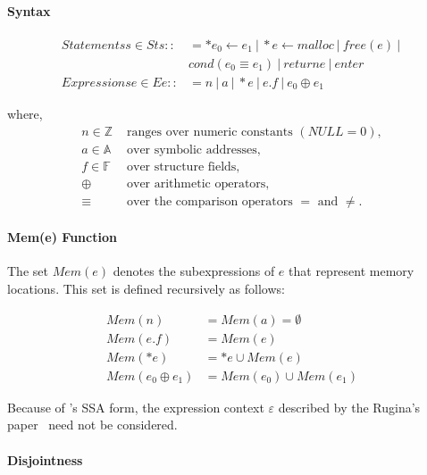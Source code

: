 \paragraph{Syntax} 
\begin{align*}
  Statements s\in St s:: &= *e_0\gets e_1\ |\ *e\gets malloc\ |\ free(e)\ |\ \\
                         &     cond(e_0\equiv e_1)\ |\ return e\ |\ enter \\
  Expressions e\in E e:: &= n\ |\ a\ |\ *e\ |\ e.f\ |\ e_0 \oplus e_1 
\end{align*}

where, 
\begin{align*}
  n\in \mathbb{Z} &\text{  ranges over numeric constants $(NULL=0)$}, \\
  a\in \mathbb{A} &\text{  over symbolic addresses,} \\
  f\in \mathbb{F} &\text{  over structure fields,} \\
           \oplus &\text{  over arithmetic operators,} \\
           \equiv &\text{  over the comparison operators $=$ and $\ne$.}
\end{align*}


\paragraph{Mem(e) Function} 

The set $Mem(e)$ denotes the subexpressions of $e$ that represent memory 
locations. This set is defined recursively as follows:

\begin{align*}
  Mem(n) &= Mem(a)=\emptyset \\
Mem(e.f) &= Mem(e) \\
 Mem(*e) &={*e}\cup Mem(e) \\
Mem(e_0 \oplus e_1) &= Mem(e_0)\cup Mem(e_1)
\end{align*}


Because of \llvm's SSA form, the expression context $\varepsilon$ described 
by the Rugina's paper~\cite{rugina} need not be considered.

\paragraph{Disjointness}

